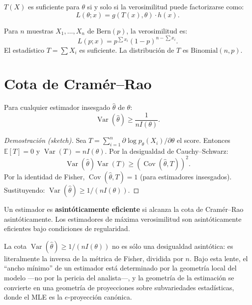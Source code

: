 \begin{theorem}
	$T(X)$ es suficiente para $\theta$ si y solo si la verosimilitud puede factorizarse como:
	\[
	L(\theta; x) = g(T(x), \theta) \cdot h(x).
	\]
\end{theorem}

\begin{example}
	Para $n$ muestras $X_1, \ldots, X_n$ de $\mathrm{Bern}(p)$, la verosimilitud es:
	\[
	L(p; x) = p^{\sum x_i}(1-p)^{n-\sum x_i}.
	\]
	El estadístico $T = \sum X_i$ es suficiente.  La distribución de $T$ es $\mathrm{Binomial}(n, p)$.
\end{example}

\section{Cota de Cramér--Rao}

\begin{theorem}
	Para cualquier estimador insesgado $\hat\theta$ de $\theta$:
	\[
	\operatorname{Var}(\hat\theta) \ge \frac{1}{n I(\theta)}.
	\]
\end{theorem}

\begin{proof}[Demostración (sketch)]
	Sea $T = \sum_{i=1}^n \partial \log p_\theta(X_i)/\partial \theta$ el score.  Entonces $\mathbb{E}[T] = 0$ y $\operatorname{Var}(T) = n I(\theta)$.  Por la desigualdad de Cauchy--Schwarz:
	\[
	\operatorname{Var}(\hat\theta) \operatorname{Var}(T) \ge (\operatorname{Cov}(\hat\theta, T))^2.
	\]
	Por la identidad de Fisher, $\operatorname{Cov}(\hat\theta, T) = 1$ (para estimadores insesgados).  Sustituyendo: $\operatorname{Var}(\hat\theta) \ge 1/(n I(\theta))$.
\end{proof}

\begin{corollary}
	Un estimador es \textbf{asintóticamente eficiente} si alcanza la cota de Cramér--Rao asintóticamente.	Los estimadores de máxima verosimilitud son asintóticamente eficientes bajo condiciones de regularidad.
\end{corollary}

\bigskip
\noindent
La cota $\operatorname{Var}(\widehat\theta) \ge 1/(nI(\theta))$ no es sólo una desigualdad asintótica: es literalmente la inversa de la métrica de Fisher, dividida por $n$. Bajo esta lente, el ``ancho mínimo'' de un estimador está determinado por la geometría local del modelo ---no por la pericia del analista---, y la geometría de la estimación se convierte en una geometría de proyecciones sobre subvariedades estadísticas, donde el MLE es la $e$-proyección canónica.

